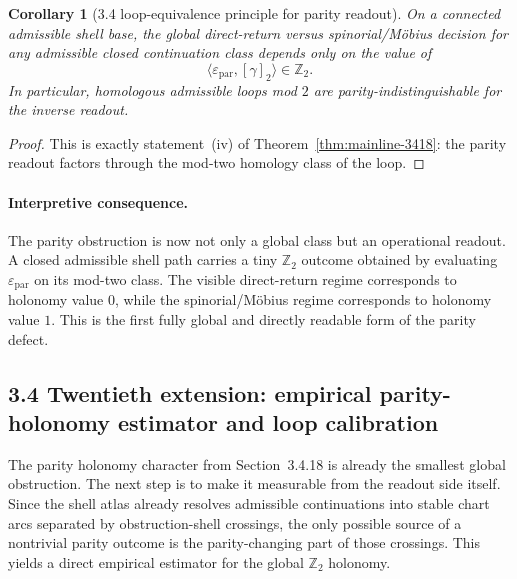\documentclass[12pt,a4paper]{article}
\newtheorem{corollary}[theorem]{Corollary}
\begin{document}
\begin{corollary}[3.4 loop-equivalence principle for parity readout]
\label{cor:mainline-3418}
On a connected admissible shell base, the global direct-return versus spinorial/M\"obius decision for any admissible closed continuation class depends only on the value of
\[
 \langle \varepsilon_{\mathrm{par}},[\gamma]_2\rangle\in\mathbb Z_2.
\]
In particular, homologous admissible loops mod $2$ are parity-indistinguishable for the inverse readout.
\end{corollary}

\begin{proof}
This is exactly statement~(iv) of Theorem~\ref{thm:mainline-3418}: the parity readout factors through the mod-two homology class of the loop.
\end{proof}

\paragraph{Interpretive consequence.}
The parity obstruction is now not only a global class but an operational readout. A closed admissible shell path carries a tiny $\mathbb Z_2$ outcome obtained by evaluating $\varepsilon_{\mathrm{par}}$ on its mod-two class. The visible direct-return regime corresponds to holonomy value $0$, while the spinorial/M\"obius regime corresponds to holonomy value $1$. This is the first fully global and directly readable form of the parity defect.



\subsection*{3.4 Twentieth extension: empirical parity-holonomy estimator and loop calibration}
The parity holonomy character from Section~3.4.18 is already the smallest global obstruction. The next step is to make it measurable from the readout side itself. Since the shell atlas already resolves admissible continuations into stable chart arcs separated by obstruction-shell crossings, the only possible source of a nontrivial parity outcome is the parity-changing part of those crossings. This yields a direct empirical estimator for the global $\mathbb Z_2$ holonomy.
\end{document}
